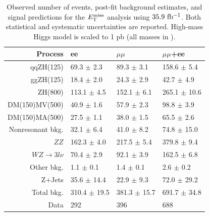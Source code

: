 \setlength{\tabcolsep}{12pt}
\begin{table}[hbtp]
  \caption{Observed number of events, post-fit background estimates, and signal 
  predictions for the $E_\mathrm{T}^{\mathrm{miss}}$ analysis using $35.9~\mathrm{fb^{-1}}$. Both statistical and systematic uncertainties are reported.
  High-mass Higgs model is scaled to 1 pb
  (all masses in \GeV).
  \label{tab:zhinvsel}}
  \begin{center}
{\footnotesize
  \begin{tabular}{rlll}
\hline 
Process & ee & $\mu\mu$ & $\mu\mu$+ee \\
\hline
qqZH(125)             &   69.3 $\pm$  2.3 &   89.3 $\pm$  3.1 &  158.6 $\pm$    5.4 \\
ggZH(125)             &   18.4 $\pm$  2.0 &   24.3 $\pm$  2.9 &   42.7 $\pm$    4.9 \\
ZH(800)               &  113.1 $\pm$  4.5 &  152.1 $\pm$  6.1 &  265.1 $\pm$   10.6 \\
DM(150)MV(500)        &   40.9 $\pm$  1.6 &   57.9 $\pm$  2.3 &   98.8 $\pm$    3.9 \\
DM(150)MA(500)        &   27.5 $\pm$  1.1 &   38.0 $\pm$  1.5 &   65.5 $\pm$    2.6 \\
\hline
Nonresonant bkg.      &   32.1 $\pm$  6.4 &   41.0 $\pm$  8.2 &   74.8 $\pm$	15.0 \\ 
$ZZ$                  &  162.3 $\pm$  4.0 &  217.5 $\pm$  5.4 &  379.8 $\pm$	 9.4 \\ 
$WZ\rightarrow3l\nu$  &   70.4 $\pm$  2.9 &   92.1 $\pm$  3.9 &  162.5 $\pm$	 6.8 \\ 
Other bkg.            &    1.1 $\pm$  0.1 &    1.4 $\pm$  0.1 &    2.6 $\pm$	 0.2 \\ 
Z+Jets                &   35.6 $\pm$ 14.4 &   22.9 $\pm$  9.3 &   72.0 $\pm$	29.2 \\ 
\hline 
Total bkg.            &  310.4 $\pm$ 19.5 &  381.3 $\pm$ 15.7 &  691.7 $\pm$   34.8 \\
\hline 
Data                  &  292              &  396              &  688                 \\
\hline
  \end{tabular}
}
  \end{center}
\end{table}
